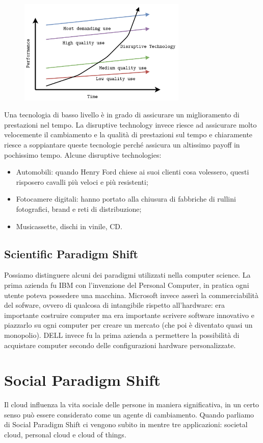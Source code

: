\begin{figure}[ht]
    \centering
    \includegraphics[width=8cm]{./Images/cap4/4.2.png}
\end{figure}

Una tecnologia di basso livello è in grado di assicurare un miglioramento di prestazioni nel tempo. La disruptive technology invece riesce ad assicurare molto velocemente il cambiamento e la qualità di prestazioni sul tempo e chiaramente riesce a soppiantare queste tecnologie perché assicura un altissimo payoff in pochissimo tempo. Alcune disruptive technologies:
\begin{itemize}
    \item Automobili: quando Henry Ford chiese ai suoi clienti cosa volessero, questi risposero cavalli più veloci e più resistenti;
    \item Fotocamere digitali: hanno portato alla chiusura di fabbriche di rullini fotografici, brand e reti di distribuzione;
    \item Musicassette, dischi in vinile, CD.
\end{itemize}
\subsection{Scientific Paradigm Shift}
Possiamo distinguere alcuni dei paradigmi utilizzati nella computer science. La prima azienda fu IBM con l'invenzione del Personal Computer, in pratica ogni utente poteva possedere una macchina.  Microsoft invece asserì la commerciabilità del sofware, ovvero di qualcosa di intangibile rispetto all'hardware: era importante costruire computer ma era importante scrivere software innovativo e piazzarlo su ogni computer per creare un mercato (che poi è diventato quasi un monopolio). DELL invece fu la prima azienda a permettere la possibilità di acquistare computer secondo delle configurazioni hardware personalizzate.

\section{Social Paradigm Shift}
Il cloud influenza la vita sociale delle persone in maniera significativa, in un certo senso può essere considerato come un agente di cambiamento. Quando parliamo di Social Paradigm Shift ci vengono subito in mentre tre applicazioni: societal cloud, personal cloud e cloud of things.

